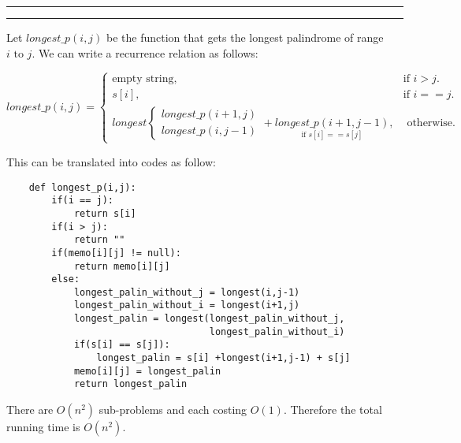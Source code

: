 \documentclass[a4paper, 12pt]{article}
\newcommand{\question}[1] {\vspace{.25in} \hrule\vspace{0.5em}
	\noindent{\bf #1} \vspace{0.5em}
	\hrule \vspace{.10in}}
\begin{document}
\question{Problem 3}

Let $longest\_p(i,j)$ be the function that gets the longest palindrome of range $i \text{ to } j$. We can write a recurrence relation as follows:

\begin{equation*}
	longest\_p(i,j) = \begin{cases}
		\text{empty string}, & \text{if } i>j.\\
		s[i], & \text{if } i == j.\\
		longest\begin{cases}
			longest\_p(i+1,j)\\
			longest\_p(i,j-1)
		\end{cases} + \underset{\text{if } s[i] == s[j]}{longest\_p(i+1,j-1)} , & \text{ otherwise.}
	\end{cases}
\end{equation*}

This can be translated into codes as follow:

\begin{lstlisting}
	def longest_p(i,j):
		if(i == j):
			return s[i]
		if(i > j):
			return ""
		if(memo[i][j] != null):
			return memo[i][j]
		else:
			longest_palin_without_j = longest(i,j-1)
			longest_palin_without_i = longest(i+1,j)
			longest_palin = longest(longest_palin_without_j,
									longest_palin_without_i)
			if(s[i] == s[j]):
				longest_palin = s[i] +longest(i+1,j-1) + s[j]
			memo[i][j] = longest_palin
			return longest_palin
\end{lstlisting}

There are $O(n^2)$ sub-problems and each costing $O(1)$. Therefore the total running time is $O(n^2)$.
\end{document}
